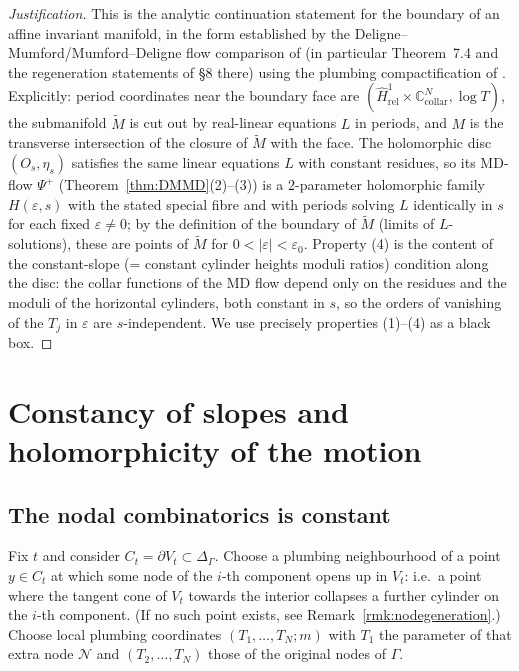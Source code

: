 \documentclass[11pt]{article}
\newcommand{\C}{\mathbb{C}}
\theoremstyle{definition}
\theoremstyle{remark}
\begin{document}
\begin{proof}[Justification]
This is the analytic continuation statement for the boundary of an affine
invariant manifold, in the form established by the
Deligne--Mumford/Mumford--Deligne flow comparison of \cite{MW} (in
particular Theorem~7.4 and the regeneration statements of \S 8 there)
using the plumbing compactification of \cite{BCGGM}. Explicitly:
period coordinates near the boundary face are
$(\widehat{H}^1_{\mathrm{rel}} \times \C^N_{\text{collar}}, \log T)$, the
submanifold $\widetilde M$ is cut out by real-linear equations $L$ in
periods, and $M$ is the transverse intersection of the closure of
$\widetilde M$ with the face. The holomorphic disc $(O_s,\eta_s)$
satisfies the same linear equations $L$ with constant residues, so its
MD-flow $\Psi^+$ (Theorem~\ref{thm:DMMD}(2)--(3)) is a
$2$-parameter holomorphic family $H(\varepsilon,s)$ with the stated
special fibre and with periods solving $L$ identically in $s$ for each
fixed $\varepsilon \neq 0$; by the definition of the boundary of $\widetilde
M$ (limits of $L$-solutions), these are points of $\widetilde M$ for
$0 < |\varepsilon| < \varepsilon_0$. Property (4) is the content of the
constant-slope (= constant cylinder heights moduli ratios) condition along
the disc: the collar functions of the MD flow depend only on the residues
and the moduli of the horizontal cylinders, both constant in $s$, so the
orders of vanishing of the $T_j$ in $\varepsilon$ are
$s$-independent. We use precisely properties (1)--(4) as a black box.
\end{proof}

\section{Constancy of slopes and holomorphicity of the motion}\label{sec:slopes}

\subsection{The nodal combinatorics is constant}

Fix $t$ and consider $C_t = \partial V_t \subset \Delta_\Gamma$. Choose a
plumbing neighbourhood of a point $y \in C_t$ at which some node of the
$i$-th component opens up in $V_t$: i.e.\ a point where the tangent cone of
$V_t$ towards the interior collapses a further cylinder on the $i$-th
component. (If no such point exists, see Remark~\ref{rmk:nodegeneration}.)
Choose local plumbing coordinates
$(T_1,\dots,T_N; m)$ with $T_1$ the parameter of that extra node
$\mathcal{N}$ and $(T_2,\dots,T_N)$ those of the original nodes of $\Gamma$.
\end{document}

